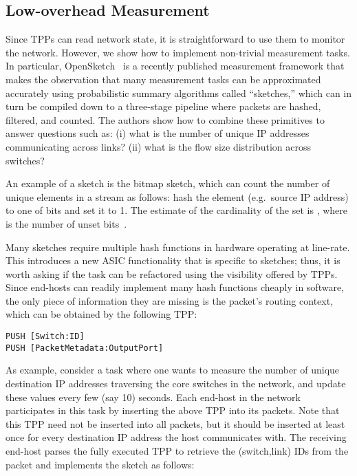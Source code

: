 \begin{eext}
\subsection{Low-overhead Measurement}\label{subsec:sketch}
Since TPPs can read network state, it is straightforward to use them
to monitor the network.  However, we show how to implement non-trivial
measurement tasks.  In particular, OpenSketch~\cite{yu2013software} is
a recently published measurement framework that makes the
observation that many measurement tasks can be approximated accurately
using probabilistic summary algorithms called ``sketches,'' which can in turn be compiled down to a three-stage
pipeline where packets are hashed, filtered, and counted.  The authors
show how to combine these primitives to answer questions such as: (i)
what is the number of unique IP addresses communicating across links?
(ii) what is the flow size distribution across switches?

An example of a sketch is the bitmap sketch, which can count the
number of unique elements in a stream as follows: hash the element
(e.g.\ source IP address) to one of  bits and set it to 1.  The
estimate of the cardinality of the set is , where 
is the number of unset bits~\cite{estan2003bitmap}.

Many sketches require multiple hash functions in hardware operating at
line-rate.  This introduces a new ASIC functionality that is specific
to sketches; thus, it is worth asking if the task can be refactored
using the visibility offered by TPPs.  Since end-hosts can readily
implement many hash functions cheaply in software, the only piece of
information they are missing is the packet's routing context, which
can be obtained by the following TPP:
\begin{verbatim}
PUSH [Switch:ID]
PUSH [PacketMetadata:OutputPort]
\end{verbatim}

As example, consider a task where one wants to measure the number of
unique destination IP addresses traversing the core switches in the
network, and update these values every few (say 10) seconds.  Each
end-host in the network participates in this task by inserting the
above TPP into its packets.  Note that this TPP need not be inserted
into all packets, but it should be inserted at least once for every
destination IP address the host communicates with.  The receiving
end-host parses the fully executed TPP to retrieve the (switch,link)
IDs from the packet and implements the sketch as follows:


\end{eext}
